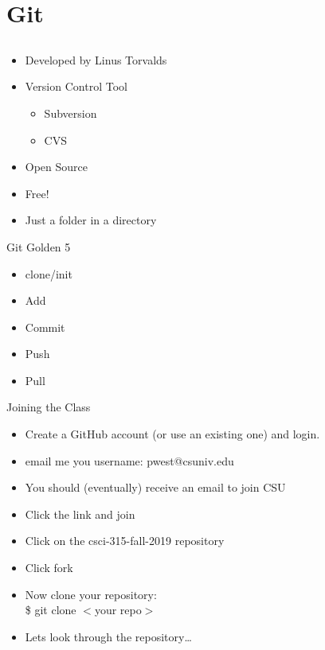 \documentclass{beamer}
\begin{document}
\section{Git}
\subsection{}
\begin{frame}{}
\begin{itemize}
\item Developed by Linus Torvalds
\item Version Control Tool
\begin{itemize}
\item Subversion
\item CVS
\end{itemize}
\item Open Source 
\item Free!
\item Just a folder in a directory
\end{itemize}
\end{frame}

\begin{frame}{Git Golden 5}
\begin{itemize}
\item clone/init
\item Add
\item Commit
\item Push
\item Pull
\end{itemize}
\end{frame}

\begin{frame}{Joining the Class}
\begin{itemize}
\item Create a GitHub account (or use an existing one) and login.
\item email me you username: pwest@csuniv.edu
\item You should (eventually) receive an email to join CSU
\item Click the link and join
\item Click on the csci-315-fall-2019 repository
\item Click fork
\item Now clone your repository:\\
\$ git clone $<$your repo$>$
\item Lets look through the repository\ldots
\end{itemize}
\end{frame}
\end{document}
